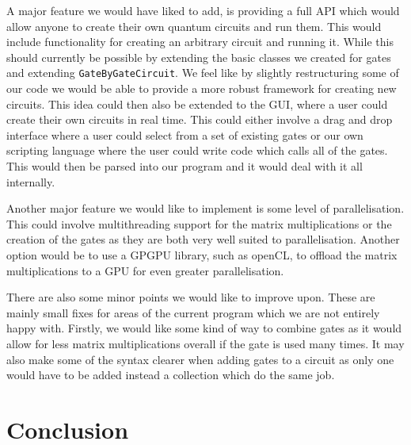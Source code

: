 \documentclass[bibliography=totocnumbered, 10pt]{article}
\theoremstyle{NoticeStyle}
\begin{document}
A major feature we would have liked to add, is providing a full API which would allow anyone to create their own quantum circuits and run them. This would include functionality for creating an arbitrary circuit and running it. While this should currently be possible by extending the basic classes we created for gates and extending \texttt{GateByGateCircuit}. We feel like by slightly restructuring some of our code we would be able to provide a more robust framework for creating new circuits. This idea could then also be extended to the GUI, where a user could create their own circuits in real time. This could either involve a drag and drop interface where a user could select from a set of existing gates or our own scripting language where the user could write code which calls all of the gates. This would then be parsed into our program and it would deal with it all internally.

Another major feature we would like to implement is some level of parallelisation. This could involve multithreading support for the matrix multiplications or the creation of the gates as they are both very well suited to parallelisation. Another option would be to use a GPGPU library, such as openCL, to offload the matrix multiplications to a GPU for even greater parallelisation.

There are also some minor points we would like to improve upon. These are mainly small fixes for areas of the current program which we are not entirely happy with. Firstly, we would like some kind of way to combine gates as it would allow for less matrix multiplications overall if the gate is used many times. It may also make some of the syntax clearer when adding gates to a circuit as only one would have to be added instead a collection which do the same job.

%
\section{Conclusion}
\end{document}
